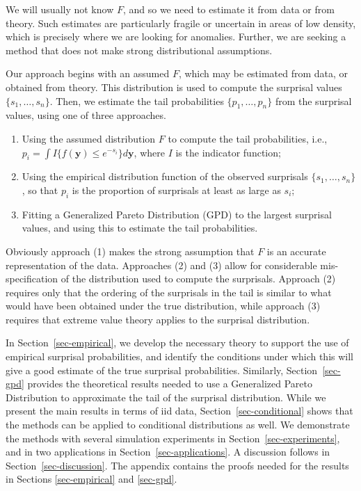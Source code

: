 \documentclass[
  12pt]{article}
\providecommand{\tightlist}{%
  \setlength{\itemsep}{0pt}\setlength{\parskip}{0pt}}
\theoremstyle{definition}
\theoremstyle{plain}
\theoremstyle{plain}
\theoremstyle{plain}
\theoremstyle{remark}
\begin{document}
We will usually not know \(F\), and so we need to estimate it from data
or from theory. Such estimates are particularly fragile or uncertain in
areas of low density, which is precisely where we are looking for
anomalies. Further, we are seeking a method that does not make strong
distributional assumptions.

Our approach begins with an assumed \(F\), which may be estimated from
data, or obtained from theory. This distribution is used to compute the
surprisal values \(\{s_1,\dots,s_n\}\). Then, we estimate the tail
probabilities \(\{p_1,\dots,p_n\}\) from the surprisal values, using one
of three approaches.

\begin{enumerate}
\def\labelenumi{(\arabic{enumi})}
\tightlist
\item
  Using the assumed distribution \(F\) to compute the tail
  probabilities, i.e.,
  \(p_i = \int I\{f(\bm{y})\le e^{-s_i}\} d\bm{y}\), where \(I\) is the
  indicator function;
\item
  Using the empirical distribution function of the observed surprisals
  \(\{s_1,\dots,s_n\}\), so that \(p_i\) is the proportion of surprisals
  at least as large as \(s_i\);
\item
  Fitting a Generalized Pareto Distribution (GPD) to the largest
  surprisal values, and using this to estimate the tail probabilities.
\end{enumerate}

Obviously approach (1) makes the strong assumption that \(F\) is an
accurate representation of the data. Approaches (2) and (3) allow for
considerable mis-specification of the distribution used to compute the
surprisals. Approach (2) requires only that the ordering of the
surprisals in the tail is similar to what would have been obtained under
the true distribution, while approach (3) requires that extreme value
theory applies to the surprisal distribution.

In Section~\ref{sec-empirical}, we develop the necessary theory to
support the use of empirical surprisal probabilities, and identify the
conditions under which this will give a good estimate of the true
surprisal probabilities. Similarly, Section~\ref{sec-gpd} provides the
theoretical results needed to use a Generalized Pareto Distribution to
approximate the tail of the surprisal distribution. While we present the
main results in terms of iid data, Section~\ref{sec-conditional} shows
that the methods can be applied to conditional distributions as well. We
demonstrate the methods with several simulation experiments in
Section~\ref{sec-experiments}, and in two applications in
Section~\ref{sec-applications}. A discussion follows in
Section~\ref{sec-discussion}. The appendix contains the proofs needed
for the results in Sections \ref{sec-empirical} and \ref{sec-gpd}.
\end{document}
